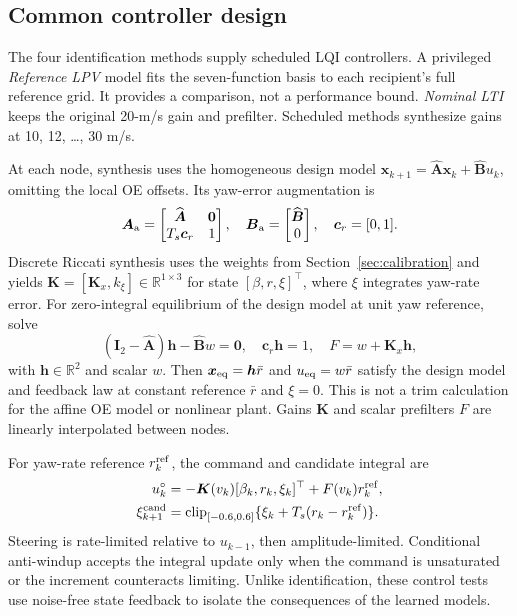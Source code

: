 \documentclass[conference]{IEEEtran}
\newcommand{\R}{\mathbb{R}}
\newcommand{\rev}[1]{\textcolor{revisiongreen}{#1}}
\newcommand{\focusrev}[1]{\textcolor{focusedrevision}{#1}}
\newcommand{\bs}[1]{\boldsymbol{#1}}
\newcommand{\method}[1]{\textit{#1}}
\newcommand{\NominalLTI}{\method{Nominal LTI}}
\newcommand{\ReferenceLPV}{\method{Reference LPV}}
\begin{document}
\subsection{Common controller design}
The four identification methods \rev{supply scheduled LQI controllers.
A} privileged \rev{\ReferenceLPV{} model fits the seven-function basis} to \rev{each
recipient's} full reference grid. \rev{It provides} a \rev{comparison}, not a performance
bound. \NominalLTI{} keeps the \rev{original} 20-m/s gain and prefilter.
\rev{Scheduled methods synthesize gains} at 10, 12, \ldots, 30 m/s.

\focusrev{At each node, synthesis uses the homogeneous design model
$\bs{x}_{k+1}=\widehat{\bs{A}}\bs{x}_k+\widehat{\bs{B}}u_k$,
omitting the local OE offsets. Its yaw-error augmentation is}
\begingroup\color{revisiongreen}
\begin{equation}
 \bs{A}_{\rm a}=\begin{bmatrix}\widehat{\bs{A}}&\bs{0}\\T_s\bs{c}_r&1\end{bmatrix},
 \quad \bs{B}_{\rm a}=\begin{bmatrix}\widehat{\bs{B}}\\0\end{bmatrix},
 \quad \bs{c}_r=[0,1].
 \label{eq:lqi-augmentation}
\end{equation}
\endgroup
Discrete Riccati synthesis uses the \rev{weights from Section~\ref{sec:calibration}
and yields $\bs{K}=[\bs{K}_x,k_\xi]\in\R^{1\times3}$ for} state
$[\beta,r,\xi]^\top$, where $\xi$ integrates yaw-rate error.
\rev{For zero-integral equilibrium of} the \focusrev{design model at} unit yaw reference, \rev{solve}
\begingroup\color{revisiongreen}
\begin{equation}
 (\bs{I}_2-\widehat{\bs{A}})\bs{h}-\widehat{\bs{B}}w=\bs{0},
 \quad \bs{c}_r\bs{h}=1,\quad F=w+\bs{K}_x\bs{h},
 \label{eq:prefilter}
\end{equation}
\endgroup
\rev{with} $\bs{h}\in\R^2$ and \rev{scalar $w$. Then $\bs{x}_{\rm eq}=\bs{h}\bar r$} and \rev{$u_{\rm eq}=w\bar r$
satisfy} the \focusrev{design model} \rev{and feedback law at constant reference $\bar r$ and $\xi=0$}.
\focusrev{This is not a trim calculation for the affine OE model or nonlinear plant.}
Gains $\bs{K}$ and \rev{scalar} prefilters $F$ are linearly interpolated between nodes.

For \rev{yaw-rate} reference $r_k^{\rm ref}$, the \rev{command and candidate integral are}
\begin{equation}
 \begin{aligned}
 u_k^\circ&=-\bs{K}(v_k)[\beta_k,r_k,\xi_k]^\top+F(v_k)r_k^{\rm ref},\\
 \xi_{k+1}^{\rm cand}&=\operatorname{clip}_{[-0.6,0.6]}
 \{\xi_k+T_s(r_k-r_k^{\rm ref})\}.
 \end{aligned}
 \label{eq:lqi-runtime}
\end{equation}
Steering is rate-limited relative to $u_{k-1}$, then amplitude-limited.
Conditional anti-windup accepts \rev{the integral update} only when the command
is unsaturated or the increment counteracts limiting.
\rev{Unlike identification, these control tests use noise-free state feedback
to isolate} the \rev{consequences of the learned models}.
\end{document}
